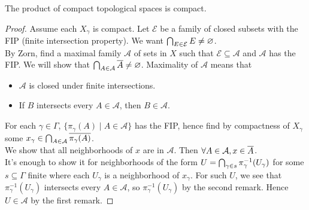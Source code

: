 \documentclass{article}
\begin{document}
\begin{nthm}[Tychonoff]
  The product of compact topological spaces is compact.
\end{nthm}
\begin{proof}
  Assume each $X_\gamma$ is compact. Let $\mathcal E$ be a family of closed subsets with the FIP (finite intersection property). We want $\bigcap_{E \in \mathcal E} E \ne \varnothing$. \\
  By Zorn, find a maximal family $\mathcal A$ of sets in $X$ such that $\mathcal E \subseteq \mathcal A$ and $\mathcal A$ has the FIP. We will show that $\bigcap_{A \in \mathcal A} \overline{A} \ne \varnothing$. Maximality of $\mathcal A$ means that
  \begin{itemize}
    \item $\mathcal A$ is closed under finite intersections.
    \item If $B$ intersects every $A \in \mathcal A$, then $B \in \mathcal A$.
  \end{itemize}
  For each $\gamma \in \Gamma$, $\{\pi_\gamma(A) \mid A \in \mathcal A\}$ has the FIP, hence find by compactness of $X_\gamma$ some $x_\gamma \in \bigcap_{A \in \mathcal A} \overline{\pi_\gamma(A)}$. \\
  We show that all neighborhoods of $x$ are in $\mathcal A$. Then $\forall A \in \mathcal A, x \in \overline{A}$. \\
  It's enough to show it for neighborhoods of the form $U = \bigcap_{\gamma \in s} \pi_\gamma^{-1}(U_\gamma)$ for some $s \subseteq \Gamma$ finite where each $U_\gamma$ is a neighborhood of $x_\gamma$. For such $U$, we see that $\pi_\gamma^{-1}(U_\gamma)$ intersects every $A \in \mathcal A$, so $\pi_\gamma^{-1}(U_\gamma)$ by the second remark. Hence $U \in \mathcal A$ by the first remark.
\end{proof}

\newlec

\printindex
\end{document}
